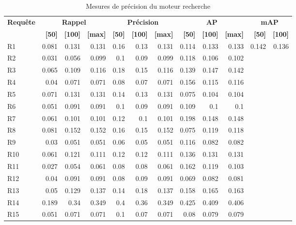\begin{table}[H]
\centering
\begin{tabular}{l|rrr|rrr|rrr|rr}
\toprule
\textbf{Requête} & \multicolumn{3}{c}{\textbf{Rappel}} & \multicolumn{3}{c}{\textbf{Précision}} & \multicolumn{3}{c}{\textbf{AP}} & \multicolumn{2}{c}{\textbf{mAP}} \\
 & \textbf{[50]} & \textbf{[100]} & \textbf{[max]} & \textbf{[50]} & \textbf{[100]} & \textbf{[max]} & \textbf{[50]} & \textbf{[100]} & \textbf{[max]} & \textbf{[50]} & \textbf{[100]} \\
\midrule
R1 & 0.081 & 0.131 & 0.131 & 0.16 & 0.13 & 0.131 & 0.114 & 0.133 & 0.133 & \multirow{15}{*}{0.142} & \multirow{15}{*}{0.136} \\
R2 & 0.031 & 0.056 & 0.099 & 0.1 & 0.09 & 0.099 & 0.118 & 0.106 & 0.102 \\
R3 & 0.065 & 0.109 & 0.116 & 0.18 & 0.15 & 0.116 & 0.139 & 0.147 & 0.142 \\
R4 & 0.04 & 0.071 & 0.071 & 0.08 & 0.07 & 0.071 & 0.156 & 0.115 & 0.116 \\
R5 & 0.071 & 0.131 & 0.131 & 0.14 & 0.13 & 0.131 & 0.075 & 0.104 & 0.104 \\
R6 & 0.051 & 0.091 & 0.091 & 0.1 & 0.09 & 0.091 & 0.109 & 0.1 & 0.1 \\
R7 & 0.061 & 0.101 & 0.101 & 0.12 & 0.1 & 0.101 & 0.198 & 0.148 & 0.148 \\
R8 & 0.081 & 0.152 & 0.152 & 0.16 & 0.15 & 0.152 & 0.075 & 0.119 & 0.118 \\
R9 & 0.03 & 0.051 & 0.051 & 0.06 & 0.05 & 0.051 & 0.116 & 0.082 & 0.082 \\
R10 & 0.061 & 0.121 & 0.111 & 0.12 & 0.12 & 0.111 & 0.136 & 0.131 & 0.131 \\
R11 & 0.027 & 0.054 & 0.061 & 0.08 & 0.08 & 0.061 & 0.162 & 0.119 & 0.103 \\
R12 & 0.04 & 0.091 & 0.091 & 0.08 & 0.09 & 0.091 & 0.069 & 0.082 & 0.081 \\
R13 & 0.05 & 0.129 & 0.137 & 0.14 & 0.18 & 0.137 & 0.158 & 0.165 & 0.163 \\
R14 & 0.189 & 0.34 & 0.349 & 0.4 & 0.36 & 0.349 & 0.425 & 0.409 & 0.406 \\
R15 & 0.051 & 0.071 & 0.071 & 0.1 & 0.07 & 0.071 & 0.08 & 0.079 & 0.079 \\
\bottomrule
\end{tabular}
\caption{Mesures de précision du moteur recherche}
\label{tab:results}
\end{table}
